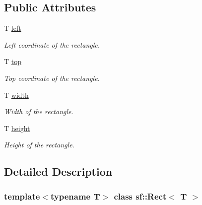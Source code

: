 \subsection*{Public Attributes}
\begin{DoxyCompactItemize}
\item 
\mbox{\label{classsf_1_1_rect_aa49960fa465103d9cb7069ceb25c7c32}} 
T \hyperlink{classsf_1_1_rect_aa49960fa465103d9cb7069ceb25c7c32}{left}
\begin{DoxyCompactList}\small\item\em Left coordinate of the rectangle. \end{DoxyCompactList}\item 
\mbox{\label{classsf_1_1_rect_abd3d3a2d0ad211ef0082bd0aa1a5c0e3}} 
T \hyperlink{classsf_1_1_rect_abd3d3a2d0ad211ef0082bd0aa1a5c0e3}{top}
\begin{DoxyCompactList}\small\item\em Top coordinate of the rectangle. \end{DoxyCompactList}\item 
\mbox{\label{classsf_1_1_rect_a4dd5b9d4333bebbc51bd309298fd500f}} 
T \hyperlink{classsf_1_1_rect_a4dd5b9d4333bebbc51bd309298fd500f}{width}
\begin{DoxyCompactList}\small\item\em Width of the rectangle. \end{DoxyCompactList}\item 
\mbox{\label{classsf_1_1_rect_a6fa0fc7de1636d78cae1a1b54eef95cd}} 
T \hyperlink{classsf_1_1_rect_a6fa0fc7de1636d78cae1a1b54eef95cd}{height}
\begin{DoxyCompactList}\small\item\em Height of the rectangle. \end{DoxyCompactList}\end{DoxyCompactItemize}


\subsection{Detailed Description}
\subsubsection*{template$<$typename T$>$\newline
class sf\+::\+Rect$<$ T $>$}

